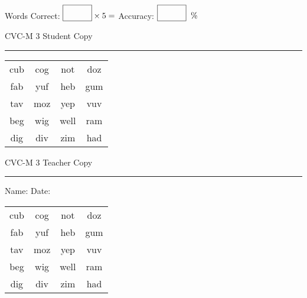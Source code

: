 \documentclass{memoir}
\begin{document}
\small

Words Correct: $\fbox{\phantom{\huge 100}} \times 5 = $ Accuracy: $\fbox{\phantom{\huge 100}}\;\; \%$ 

\vfill

\newpage


\footnotesize \noindent
CVC-M 3 \hfill Student Copy
\smallskip
\hrule

\Large

\setlength{\tabcolsep}{14pt}
\def\arraystretch{2}

{\selectfont


\begin{vplace}[0.5]
\begin{center}
\begin{tabular}{cccc}
cub & cog & not & doz \\
fab & yuf & heb & gum  \\
tav & moz & yep & vuv \\
beg & wig & well & ram \\
dig & div & zim & had \\
\end{tabular}
\end{center}
\end{vplace}

}

\newpage

\footnotesize \noindent
CVC-M 3 \hfill Teacher Copy
\smallskip
\hrule

\small

\vfill

\noindent
Name: \underline{\hspace{1.75in}} \hfill Date: \underline{\hspace{1in}}

\Large

{\selectfont


\begin{vplace}[0.5]
\begin{center}
\begin{tabular}{cccc}
cub & cog & not & doz \\
fab & yuf & heb & gum  \\
tav & moz & yep & vuv \\
beg & wig & well & ram \\
dig & div & zim & had \\
\end{tabular}
\end{center}
\end{vplace}



}
\end{document}
